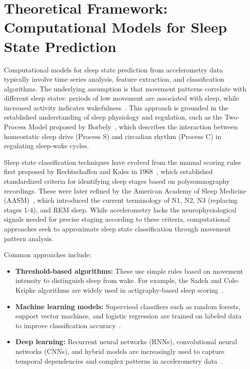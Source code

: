 \documentclass[conference]{IEEEtran}
\begin{document}
\section{Theoretical Framework: Computational Models for Sleep State Prediction}

Computational models for sleep state prediction from accelerometry data typically involve time series analysis, feature extraction, and classification algorithms. The underlying assumption is that movement patterns correlate with different sleep states: periods of low movement are associated with sleep, while increased activity indicates wakefulness~\cite{pmc4883440, researchgate2021, sadeh2011}. This approach is grounded in the established understanding of sleep physiology and regulation, such as the Two-Process Model proposed by Borbely~\cite{borbely1982}, which describes the interaction between homeostatic sleep drive (Process S) and circadian rhythm (Process C) in regulating sleep-wake cycles.

Sleep state classification techniques have evolved from the manual scoring rules first proposed by Rechtschaffen and Kales in 1968~\cite{rechtschaffen1968}, which established standardized criteria for identifying sleep stages based on polysomnography recordings. These were later refined by the American Academy of Sleep Medicine (AASM)~\cite{aasm2007}, which introduced the current terminology of N1, N2, N3 (replacing stages 1-4), and REM sleep. While accelerometry lacks the neurophysiological signals needed for precise staging according to these criteria, computational approaches seek to approximate sleep state classification through movement pattern analysis.

Common approaches include:
\begin{itemize}
	\item \textbf{Threshold-based algorithms:} These use simple rules based on movement intensity to distinguish sleep from wake. For example, the Sadeh and Cole-Kripke algorithms are widely used in actigraphy-based sleep scoring~\cite{van2011review, sadeh2011}.
	\item \textbf{Machine learning models:} Supervised classifiers such as random forests, support vector machines, and logistic regression are trained on labeled data to improve classification accuracy~\cite{van2011review, zhang2020machine, vanHees2015}.
	\item \textbf{Deep learning:} Recurrent neural networks (RNNs), convolutional neural networks (CNNs), and hybrid models are increasingly used to capture temporal dependencies and complex patterns in accelerometry data~\cite{zhang2020machine, behar2013}.
\end{itemize}
\end{document}
